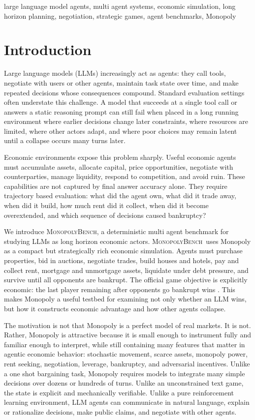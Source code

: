 \documentclass[conference]{IEEEtran}
\newcommand{\Bench}{\textsc{MonopolyBench}}
\begin{document}
\begin{IEEEkeywords}
large language model agents, multi agent systems, economic simulation, long horizon planning, negotiation, strategic games, agent benchmarks, Monopoly
\end{IEEEkeywords}

\section{Introduction}

Large language models (LLMs) increasingly act as agents: they call tools, negotiate with users or other agents, maintain task state over time, and make repeated decisions whose consequences compound. Standard evaluation settings often understate this challenge. A model that succeeds at a single tool call or answers a static reasoning prompt can still fail when placed in a long running environment where earlier decisions change later constraints, where resources are limited, where other actors adapt, and where poor choices may remain latent until a collapse occurs many turns later.

Economic environments expose this problem sharply. Useful economic agents must accumulate assets, allocate capital, price opportunities, negotiate with counterparties, manage liquidity, respond to competition, and avoid ruin. These capabilities are not captured by final answer accuracy alone. They require trajectory based evaluation: what did the agent own, what did it trade away, when did it build, how much rent did it collect, when did it become overextended, and which sequence of decisions caused bankruptcy?

We introduce \Bench, a deterministic multi agent benchmark for studying LLMs as long horizon economic actors. \Bench\ uses Monopoly as a compact but strategically rich economic simulation. Agents must purchase properties, bid in auctions, negotiate trades, build houses and hotels, pay and collect rent, mortgage and unmortgage assets, liquidate under debt pressure, and survive until all opponents are bankrupt. The official game objective is explicitly economic: the last player remaining after opponents go bankrupt wins \cite{hasbro_rules}. This makes Monopoly a useful testbed for examining not only whether an LLM wins, but how it constructs economic advantage and how other agents collapse.

The motivation is not that Monopoly is a perfect model of real markets. It is not. Rather, Monopoly is attractive because it is small enough to instrument fully and familiar enough to interpret, while still containing many features that matter in agentic economic behavior: stochastic movement, scarce assets, monopoly power, rent seeking, negotiation, leverage, bankruptcy, and adversarial incentives. Unlike a one shot bargaining task, Monopoly requires models to integrate many simple decisions over dozens or hundreds of turns. Unlike an unconstrained text game, the state is explicit and mechanically verifiable. Unlike a pure reinforcement learning environment, LLM agents can communicate in natural language, explain or rationalize decisions, make public claims, and negotiate with other agents.
\end{document}

